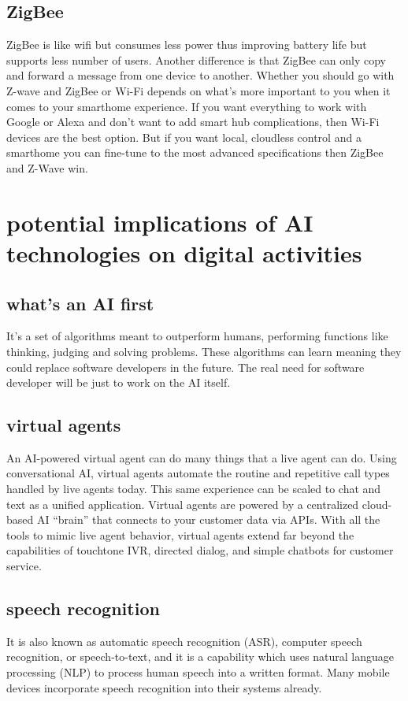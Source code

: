 \documentclass[a4paper,12pt]{book}
\begin{document}
\subsection{ZigBee}
ZigBee is like wifi but consumes less power thus improving battery life but supports less number of users.
Another difference is that ZigBee can only copy and forward a message from one device to another. 
Whether you should go with Z-wave and ZigBee or Wi-Fi depends on what’s more important to you when it comes to your smarthome experience. If you want everything to work with Google or Alexa and don’t want to add smart hub complications, then Wi-Fi devices are the best option. But if you want local, cloudless control and a smarthome you can fine-tune to the most advanced specifications then ZigBee and Z-Wave win.

\section{potential implications of AI technologies on digital activities}

\subsection{what's an AI first}
It's a set of algorithms meant to outperform humans, performing functions like thinking, judging and solving problems. These algorithms can learn meaning they could replace software developers in the future. The real need for software developer will be just to work on the AI itself.

\subsection{virtual agents}

An AI-powered virtual agent can do many things that a live agent can do. Using conversational AI, virtual agents automate the routine and repetitive call types handled by live agents today. This same experience can be scaled to chat and text as a unified application. Virtual agents are powered by a centralized cloud-based AI “brain” that connects to your customer data via APIs. With all the tools to mimic live agent behavior, virtual agents extend far beyond the capabilities of touchtone IVR, directed dialog, and simple chatbots for customer service.

\subsection{speech recognition}
It is also known as automatic speech recognition (ASR), computer speech recognition, or speech-to-text, and it is a capability which uses natural language processing (NLP) to process human speech into a written format. Many mobile devices incorporate speech recognition into their systems already.
 



\clearpage
\printindex
\end{document}
